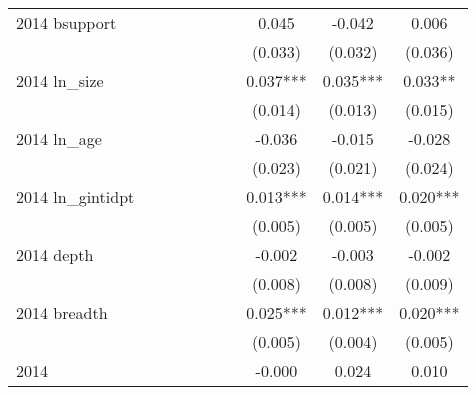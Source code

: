 \begin{table}[htbp]
\begin{tabular}{l*{9}{c}}
2014 bsupport       &               &               &               &               &               &               &       0.045   &      -0.042   &       0.006   \\
                    &               &               &               &               &               &               &     (0.033)   &     (0.032)   &     (0.036)   \\
2014 ln\_size        &               &               &               &               &               &               &       0.037***&       0.035***&       0.033** \\
                    &               &               &               &               &               &               &     (0.014)   &     (0.013)   &     (0.015)   \\
2014 ln\_age         &               &               &               &               &               &               &      -0.036   &      -0.015   &      -0.028   \\
                    &               &               &               &               &               &               &     (0.023)   &     (0.021)   &     (0.024)   \\
2014 ln\_gintidpt    &               &               &               &               &               &               &       0.013***&       0.014***&       0.020***\\
                    &               &               &               &               &               &               &     (0.005)   &     (0.005)   &     (0.005)   \\
2014 depth          &               &               &               &               &               &               &      -0.002   &      -0.003   &      -0.002   \\
                    &               &               &               &               &               &               &     (0.008)   &     (0.008)   &     (0.009)   \\
2014 breadth        &               &               &               &               &               &               &       0.025***&       0.012***&       0.020***\\
                    &               &               &               &               &               &               &     (0.005)   &     (0.004)   &     (0.005)   \\
2014                &               &               &               &               &               &               &      -0.000   &       0.024   &       0.010   \\

\end{tabular}
\end{table}
